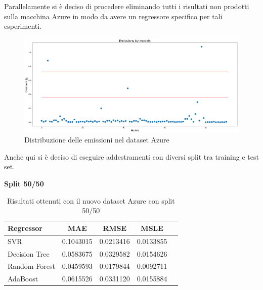 \noindent Parallelamente si è deciso di procedere eliminando tutti i risultati non prodotti sulla macchina Azure in modo da avere un regressore specifico per tali esperimenti.

\begin{figure}[H]
    \centering
    \includegraphics[scale=0.25]{images/nuova-situazione2.png}
    \caption{Distribuzione delle emissioni nel dataset Azure}
\end{figure}


\noindent Anche qui si è deciso di eseguire addestramenti con diversi split tra training e test set.

\noindent\textbf{Split 50/50}

\begin{table}[H]
    \centering
    \begin{tabular}{|>{\centering\arraybackslash}m{5cm}|c|c|c|c|}
        \hline
        \textbf{Regressor} & \textbf{MAE} & \textbf{RMSE} & \textbf{MSLE} \\ [10pt]
        \hline
        SVR & 0.1043015 & 0.0213416 & 0.0133855 \\ [10pt]
        \hline
        Decision Tree & 0.0583675 & 0.0329582 & 0.0154626 \\ [10pt]
        \hline
        Random Forest & 0.0459593 & 0.0179844 & 0.0092711 \\ [10pt]
        \hline
        AdaBoost & 0.0615526 & 0.0331120 & 0.0155884 \\ [10pt]
        \hline
    \end{tabular}
    \caption{Risultati ottenuti con il nuovo dataset Azure con split 50/50}
    \label{tab:results}
\end{table}

